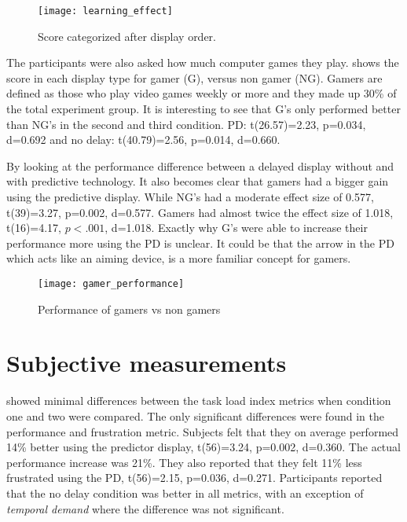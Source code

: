 \begin{figure}[h!]
    \centering
    \texttt{[image: learning\_effect]}
    \caption{Score categorized after display order.}
    \label{learning_effect}
\end{figure}

The participants were also asked how much computer games they play.  shows the score in each display type for gamer (G), versus non gamer (NG). Gamers are defined as those who play video games weekly or more and they made up 30\% of the total experiment group. It is interesting to see that G's only performed better than NG's in the second and third condition. PD: t(26.57)=2.23, p=0.034, d=0.692 and no delay: t(40.79)=2.56, p=0.014, d=0.660.

By looking at the performance difference between a delayed display without and with predictive technology. It also becomes clear that gamers had a bigger gain using the predictive display. While NG's had a moderate effect size of 0.577, t(39)=3.27, p=0.002, d=0.577. Gamers had almost twice the effect size of 1.018, t(16)=4.17, $p<.001$, d=1.018. Exactly why G's were able to increase their performance more using the PD is unclear. It could be that the arrow in the PD which acts like an aiming device, is a more familiar concept for gamers.


\begin{figure}[h!]
    \centering
    \texttt{[image: gamer\_performance]}
    \caption{Performance of gamers vs non gamers}
    \label{gamer_performance}
\end{figure}


\section{Subjective measurements}

 showed minimal differences between the task load index metrics when condition one and two were compared. The only significant differences were found in the performance and frustration metric. Subjects felt that they on average performed 14\% better using the predictor display, t(56)=3.24, p=0.002, d=0.360. The actual performance increase was 21\%. They also reported that they felt 11\% less frustrated using the PD, t(56)=2.15, p=0.036, d=0.271. Participants reported that the no delay condition was better in all metrics, with an exception of \emph{temporal demand} where the difference was not significant.

